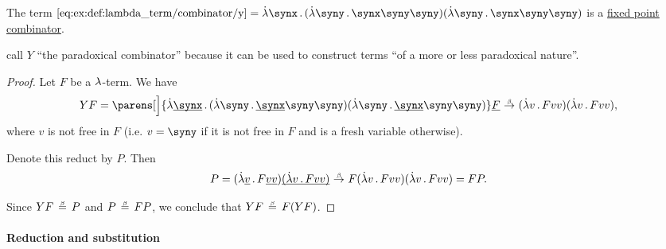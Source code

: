 \begin{proposition}\label{thm:y_is_a_fixed_point_combinator}
  The term \( \ref{eq:ex:def:lambda_term/combinator/y} = \qabs \synx (\qabs \syny \synx \syny \syny) (\qabs \syny \synx \syny \syny) \) is a \hyperref[def:function_fixed_point_combinator]{fixed point combinator}.
\end{proposition}
\begin{comments}
  \item {} call \( Y \) \enquote{the paradoxical combinator} because it can be used to construct terms \enquote{of a more or less paradoxical nature}.
\end{comments}
\begin{proof}
  Let \( F \) be a \( {\mathrm \lambda} \)-term. We have
  \begin{equation*}
    YF
    =
    \parens[\Big]{ \qabs {\hi{\synx}} (\qabs \syny \hi{\synx} \syny \syny) (\qabs \syny \hi{\synx} \syny \syny) } \hi{F}
    \bred
    (\qabs v F v v) (\qabs v F v v),
  \end{equation*}
  where \( v \) is not free in \( F \) (i.e. \( v = \syny \) if it is not free in \( F \) and is a fresh variable otherwise).

  Denote this reduct by \( P \). Then
  \begin{equation*}
    P =
    (\qabs {\hi{v}} F \hi{v} \hi{v}) \hi{(\qabs v F v v)}
    \bred
    F (\qabs v F v v) (\qabs v F v v)
    =
    FP.
  \end{equation*}

  Since \( YF \equivrel\beta P \) and \( P \equivrel\beta FP \), we conclude that \( YF \equivrel\beta F(YF) \).
\end{proof}

\paragraph{Reduction and substitution}


